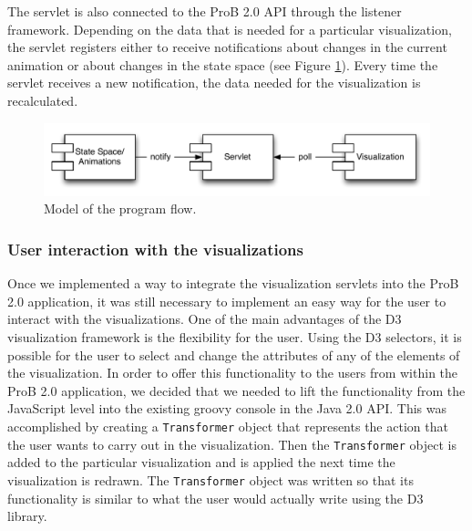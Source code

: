 The servlet is also connected to the ProB 2.0 API through the listener framework. Depending on the data that is needed for a particular visualization, the servlet registers either to receive notifications about changes in the current animation or about changes in the state space (see Figure \ref{programFlow}). Every time the servlet receives a new notification, the data needed for the visualization is recalculated.

\begin{center}
\begin{figure}[h!]
\includegraphics[width=14cm]{bilder/programFlow.pdf}
\caption{Model of the program flow.}
\label{programFlow}
\end{figure}
\end{center}

\subsubsection{User interaction with the visualizations}

Once we implemented a way to integrate the visualization servlets into the ProB 2.0 application, it was still necessary to implement an easy way for the user to interact with the visualizations. One of the main advantages of the D3 visualization framework is the flexibility for the user. Using the D3 selectors, it is possible for the user to select and change the attributes of any of the elements of the visualization. In order to offer this functionality to the users from within the ProB 2.0 application, we decided that we needed to lift the functionality from the JavaScript level into the existing groovy console in the Java 2.0 API. This was accomplished by creating a \texttt{Transformer} object that represents the action that the user wants to carry out in the visualization. Then the \texttt{Transformer} object is added to the particular visualization and is applied the next time the visualization is redrawn. The \texttt{Transformer} object was written so that its functionality is similar to what the user would actually write using the D3 library.

